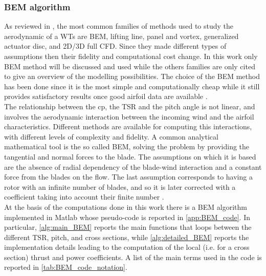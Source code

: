 \subsubsection{BEM algorithm}\label{subsec:BEM_algorithm}
As reviewed in \cite{HANSEN2006285}, the most common families of methods used to study the aerodynamic of a WTs are \acrfull{BEM}, lifting line, panel and vortex, generalized actuator disc, and 2D/3D full CFD. Since they made different types of assumptions then their fidelity and computational cost change. In this work only \acrshort{BEM} method will be discussed and used while the others families are only cited to give an overview of the modelling possibilities. The choice of the BEM method has been done since it is the most simple and computationally cheap while it still provides satisfactory results once good airfoil data are available \cite{HANSEN2006285}.\\
The relationship between the \acrshort{cp}, the \acrshort{TSR} and the pitch angle is not linear, and involves the aerodynamic interaction between the incoming wind and the airfoil characteristics. Different methods are available for computing this interactions, with different levels of complexity and fidelity. A common analytical mathematical tool is the so called \acrshort{BEM}, solving the problem by providing the tangential and normal forces to the blade. The assumptions on which it is based are the absence of radial dependency of the blade-wind interaction and a constant force from the blades on the flow. The last assumption corresponds to having a rotor with an infinite number of blades, and so it is later corrected with a coefficient taking into account their finite number \cite{Aerodynamics_of_wind_turbines}.\\
At the basis of the computations done in this work there is a \acrshort{BEM} algorithm implemented in Matlab whose pseudo-code is reported in \autoref{app:BEM_code}. In particular, \autoref{alg:main_BEM} reports the main functions that loops between the different TSR, pitch, and cross sections, while \autoref{alg:detailed_BEM} reports the implementation details leading to the computation of the local (i.e. for a cross section) thrust and power coefficients. A list of the main terms used in the code is reported in \autoref{tab:BEM_code_notation}. \\


